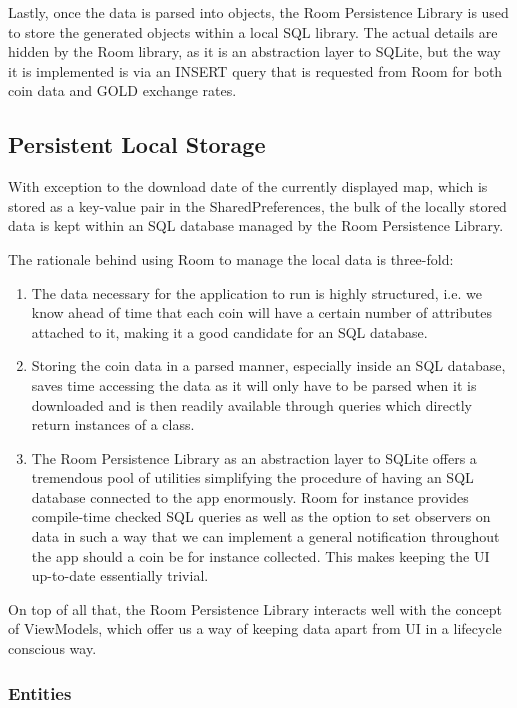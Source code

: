 \documentclass[11pt,a4paper,notitlepage]{article}
\begin{document}
    Lastly, once the data is parsed into objects, the Room Persistence Library \cite{room} is used to store the generated objects within a local SQL library. The actual details are hidden by the Room library, as it is an abstraction layer to SQLite, but the way it is implemented is via an INSERT query that is requested from Room for both coin data and GOLD exchange rates.

\subsection{Persistent Local Storage}

    With exception to the download date of the currently displayed map, which is stored as a key-value pair in the SharedPreferences, the bulk of the locally stored data is kept within an SQL database managed by the Room Persistence Library. \cite{room}

    The rationale behind using Room to manage the local data is three-fold:

        \begin{enumerate}
            \item The data necessary for the application to run is highly structured, i.e. we know ahead of time that each coin will have a certain number of attributes attached to it, making it a good candidate for an SQL database.
            \item Storing the coin data in a parsed manner, especially inside an SQL database, saves time accessing the data as it will only have to be parsed when it is downloaded and is then readily available through queries which directly return instances of a class.
            \item The Room Persistence Library as an abstraction layer to SQLite offers a tremendous pool of utilities simplifying the procedure of having an SQL database connected to the app enormously. Room for instance provides compile-time checked SQL queries as well as the option to set observers on data in such a way that we can implement a general notification throughout the app should a coin be for instance collected. This makes keeping the UI up-to-date essentially trivial.
        \end{enumerate}

    On top of all that, the Room Persistence Library interacts well with the concept of ViewModels, which offer us a way of keeping data apart from UI in a lifecycle conscious way. \cite{view-models}

\subsubsection{Entities}
\end{document}

